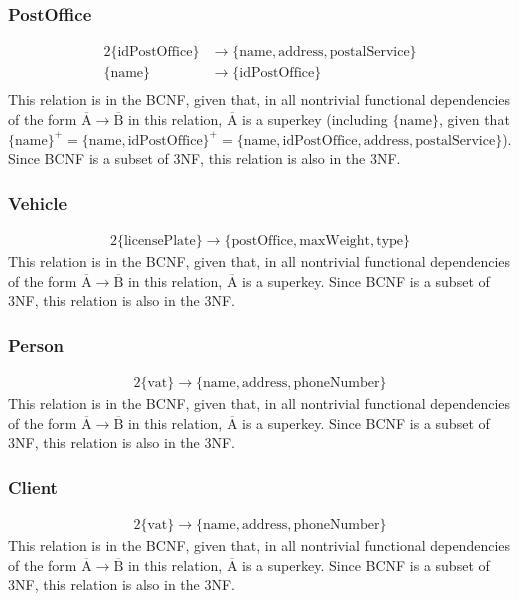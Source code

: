\documentclass{report}[a4paper]
\theoremstyle{remark}
\begin{document}
\subsubsection{PostOffice}
\begin{alignat*}{2}
\{\text{idPostOffice}\} &\rightarrow \{\text{name},\text{address},\text{postalService}\} \\
\{\text{name}\} &\rightarrow \{\text{idPostOffice}\} \\
\end{alignat*}
This relation is in the BCNF, given that, in all nontrivial functional dependencies of the form $\overline{\text{A}} \rightarrow \overline{\text{B}}$ in this relation, $\overline{\text{A}}$ is a superkey (including $\{\text{name}\}$, given that $\{\text{name}\}^+ = \{\text{name}, \text{idPostOffice}\}^+ = \{\text{name}, \text{idPostOffice}, \text{address}, \text{postalService}\}$). Since BCNF is a subset of 3NF, this relation is also in the 3NF.
\subsubsection{Vehicle}
\begin{alignat*}{2}
\{\text{licensePlate}\} \rightarrow \{\text{postOffice},\text{maxWeight},\text{type}\}
\end{alignat*}
This relation is in the BCNF, given that, in all nontrivial functional dependencies of the form $\overline{\text{A}} \rightarrow \overline{\text{B}}$ in this relation, $\overline{\text{A}}$ is a superkey. Since BCNF is a subset of 3NF, this relation is also in the 3NF.
\subsubsection{Person}
\begin{alignat*}{2}
\{\text{vat}\} \rightarrow \{\text{name},\text{address},\text{phoneNumber}\}
\end{alignat*}
This relation is in the BCNF, given that, in all nontrivial functional dependencies of the form $\overline{\text{A}} \rightarrow \overline{\text{B}}$ in this relation, $\overline{\text{A}}$ is a superkey. Since BCNF is a subset of 3NF, this relation is also in the 3NF.
\subsubsection{Client}
\begin{alignat*}{2}
\{\text{vat}\} \rightarrow \{\text{name},\text{address},\text{phoneNumber}\}
\end{alignat*}
This relation is in the BCNF, given that, in all nontrivial functional dependencies of the form $\overline{\text{A}} \rightarrow \overline{\text{B}}$ in this relation, $\overline{\text{A}}$ is a superkey. Since BCNF is a subset of 3NF, this relation is also in the 3NF.
\end{document}
